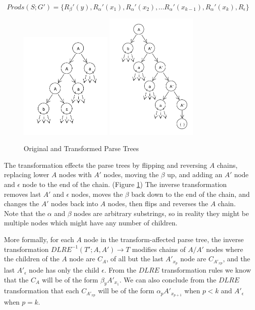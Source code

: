 \documentclass[11pt]{article}
\begin{document}
{\[Prods(S;G') = \{R_\beta'(y), R_\alpha'(x_1), R_\alpha'(x_2), ... R_\alpha'(x_{k-1}), R_\alpha'(x_k), R_\epsilon\}\]

\begin{figure}[h!]
    \centering
    \includegraphics[width=0.4\textwidth,natwidth=1,natheight=1]{umlet/dlre_orig.pdf}
    \includegraphics[width=0.4\textwidth,natwidth=1,natheight=1]{umlet/dlre_comp.pdf}
    \caption{Original and Transformed Parse Trees}
    \label{fig:dlre}
\end{figure}

The transformation effects the parse trees by flipping and reversing $A$ chains,
replacing lower $A$ nodes with $A'$ nodes, moving the $\beta$ up,
and adding an $A'$ node and $\epsilon$ node to the end of the chain. (Figure \ref{fig:dlre}) The inverse transformation
removes last $A'$ and $\epsilon$ nodes, moves the $\beta$ back down to the end of the chain, and changes the $A'$ nodes back into
$A$ nodes, then flips and reverses the $A$ chain. Note that the $\alpha$ and $\beta$ nodes are arbitrary substrings, so in reality
they might be multiple nodes which might have any number of children.

More formally, for each $A$ node in the transform-affected parse tree, the inverse transformation $DLRE^{-1}(T'; A, A') \rightarrow T$
modifies chains of $A/A'$ nodes where the children of the $A$ node are $C_A$, of all but the last $A'_{x_p}$ node are $C_{A'_{x p}}$,
and the last $A'_\epsilon$ node has only the child $\epsilon$.
From the $DLRE$ transformation rules we know that the $C_A$ will be of the form $\beta_y A'_{x_1}$. 
We can also conclude from the $DLRE$ transformation that each $C_{A'_{x p}}$ will be of the form $\alpha_p A'_{x_{p+1}}$
when $p < k$ and $A'_\epsilon$ when $p=k$. 

}
\end{document}
